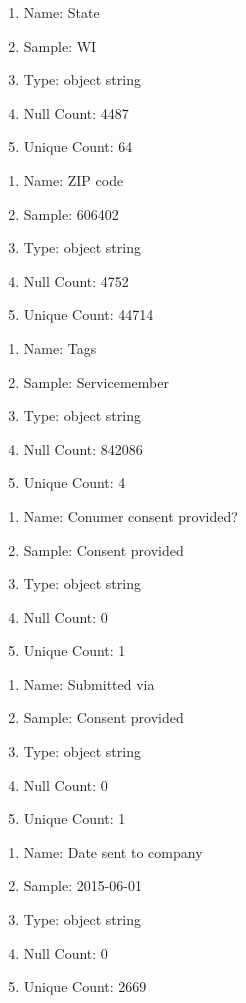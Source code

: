\documentclass{article}
\begin{document}
\begin{enumerate}
\item Name: State
\item Sample: 
WI
\item Type: object string
\item Null Count: 4487
\item Unique Count: 64
\end{enumerate}

\begin{enumerate}
\item Name: ZIP code
\item Sample: 
	606402
\item Type: object string
\item Null Count: 4752
\item Unique Count: 44714 
\end{enumerate}

\begin{enumerate}
\item Name: Tags
\item Sample: 
	Servicemember
\item Type: object string
\item Null Count: 842086
\item Unique Count: 4 
\end{enumerate}

\begin{enumerate}
\item Name: Conumer consent provided?
\item Sample: 
	Consent provided 
\item Type: object string
\item Null Count: 0
\item Unique Count: 1 
\end{enumerate}

\begin{enumerate}
\item Name: Submitted via
\item Sample: 
	Consent provided 
\item Type: object string
\item Null Count: 0
\item Unique Count: 1 
\end{enumerate}

\begin{enumerate}
\item Name: Date sent to company
\item Sample: 
	2015-06-01 
\item Type: object string
\item Null Count: 0
\item Unique Count: 2669 
\end{enumerate}
\end{document}
